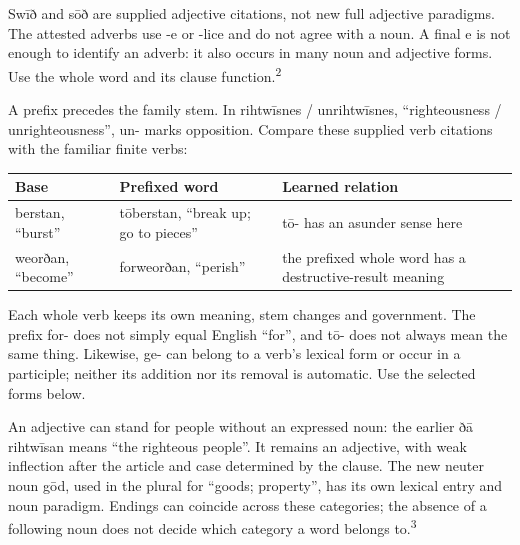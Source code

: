 Swīð and sōð are supplied adjective citations, not new full adjective paradigms. The attested adverbs use -e or -lice and do not agree with a noun. A final e is not enough to identify an adverb: it also occurs in many noun and adjective forms. Use the whole word and its clause function.\textsuperscript{2}

A prefix precedes the family stem. In rihtwīsnes /\allowbreak{} unrihtwīsnes, “righteousness /\allowbreak{} unrighteousness”, un- marks opposition. Compare these supplied verb citations with the familiar finite verbs:

\par\begingroup
\fontsize{10.5}{13.2}\selectfont
\setlength{\LTleft}{0pt}\setlength{\LTright}{\fill}
\noindent
\begin{tabular}{@{}>{\raggedright\arraybackslash}p{20.69mm}>{\raggedright\arraybackslash}p{37.43mm}>{\raggedright\arraybackslash}p{60.26mm}@{}}
\toprule
\textbf{Base} & \textbf{Prefixed word} & \textbf{Learned relation} \\
\midrule
berstan, “burst” & tōberstan, “break up; go to pieces” & tō- has an asunder sense here \\
weorðan, “become” & forweorðan, “perish” & the prefixed whole word has a destructive-result meaning \\
\bottomrule
\end{tabular}
\par\endgroup

Each whole verb keeps its own meaning, stem changes and government. The prefix for- does not simply equal English “for”, and tō- does not always mean the same thing. Likewise, ge- can belong to a verb’s lexical form or occur in a participle; neither its addition nor its removal is automatic. Use the selected forms below.

An adjective can stand for people without an expressed noun: the earlier ðā rihtwīsan means “the righteous people”. It remains an adjective, with weak inflection after the article and case determined by the clause. The new neuter noun gōd, used in the plural for “goods; property”, has its own lexical entry and noun paradigm. Endings can coincide across these categories; the absence of a following noun does not decide which category a word belongs to.\textsuperscript{3}

